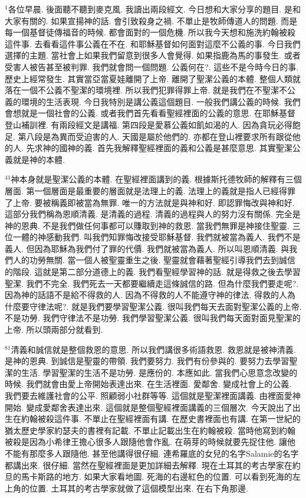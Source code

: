 \documentclass{book}
\begin{document}
$^{1}$各位早晨.
後面聽不聽到麥克風.
我讀出兩段經文.
今日想和大家分享的題目.
是和大家有關的.
如果宣揚神的話.
會引致殺身之禍.
不單止是牧師傳道人的問題.
而是每一個基督徒傳福音的時候.
都會面對的一個危機.
所以我今天想和施洗約翰被殺這件事.
去看看這件事公義在不在.
和耶穌基督如何面對這麼不公義的事.
今日我們選擇的主題.
當社會上如果我們留意到很多人會覺得.
如果指鹿為馬的事發生.
或者受害人被告甚至被判罪.
我們就會問一個問題.
公義何在?.
這些不是今時今日的事.
歷史上經常發生.
其實當亞當夏娃離開了上帝.
離開了聖潔公義的本體.
整個人類就落在一個不公義不聖潔的環境裡.
所以我們犯罪得罪上帝.
就是我們在不聖潔不公義的環境的生活表現.
今日我特別是講公義這個題目.
一般我們講公義的時候.
我們會想就是一個社會的公義.
或者我們首先看看聖經裡面的公義的意思.
在耶穌基督登山補訓裡.
有兩段經文是講福.
第四段是愛慕公義如飢如渴的人.
因為貪玩必得飽足.
第八段是為異而受迫害的人.
天國是屬於他們的.
亦都在登山裡要求所有跟從他的人.
先求神的國神的義.
首先我解釋聖經裡面的義和公義是甚麼意思.
其實聖潔公義就是神的本體.

$^{41}$神本身就是聖潔公義的本體.
在聖經裡面講到的義.
根據斯托德牧師的解釋有三個層面.
第一個層面是最重要的層面就是法理上的義.
法理上的義就是指人已經得罪了上帝.
要被稱義即被當為無罪.
唯一的方法就是與神和好.
即認罪悔改與神和好.
這部分我們稱為恩順清義.
是清義的過程.
清義的過程與人的努力沒有關係.
完全是神的恩典.
不是我們做任何事都可以賺取到神的救恩.
當我們無罪是神接住聖靈.
三位一體的神感動我們.
叫我們知罪悔改接受耶穌基督.
我們就被當為義人.
我們不是義人.
但因為耶穌為我們付了罪的代價.
我們就被當為義人.
所以叫恩順清義.
與我們人的功勞無關.
當一個人被聖靈重生之後.
聖靈就會藉著聖經引導我們去到誠信的階段.
這就是第二部分道德上的義.
我們看聖經學習神的話.
就是得救之後去學習聖潔.
我們不完全.
我們死去一天都要繼續走這條誠信的路.
但為什麼我們要走呢?.
因為神的話語不是給不得救的人.
因為不得救的人不能遵守神的律法.
得救的人為什麼要守律法呢?.
就是我們要學習聖潔公義.
很叫我們每天去面對聖潔公義的上帝.
不是功勞.
我們守律法不是功勞.
我們學習聖潔公義.
很叫我們每天面對面見聖潔的上帝.
所以頭兩部分就看到.

$^{81}$清義和誠信就是整個救恩的意思.
所以我們講很多術語救恩.
救恩就是被神清義.
是神的恩典.
到誠信是聖靈的帶領.
我們要努力.
我們有份參與的.
要努力去學習聖潔的生活.
學習聖潔的生活不是功勞.
是應份的.
本應如此.
當我們心思意念改變的時候.
我們就會由愛上帝開始表達出來.
在生活裡面.
愛鄰舍.
變成社會上的公義.
我們要去維護社會的公平.
照顧弱小社群等等.
這個就是聖潔裡面講義.
由裡面愛神開始.
變成愛鄰舍表達出來.
這個就是整個聖經裡面講義的三個層次.
今天說出了出生在約翰被殺這件事.
不單止在聖經裡面有講.
在歷史書裡面也有講.
在第一世紀的猶太歷史學家約瑟夫的書裡有記載.
不單止記載出生在約翰被殺.
當時他寫到約翰被殺是因為小希律王擔心很多人跟隨他會作亂.
在萌芽的時候就要先捉住他.
讓他不能有那麼多人跟隨他.
甚至他講得很仔細.
連希羅底的女兒的名字Salamie的名字都講出來.
很仔細.
當然在聖經裡面是更加詳細去解釋.
現在土耳其的考古學家在約旦的馬卡斯路的地方.
如果大家看地圖.
死海的右邊紅色的位置.
可以看到死海的左上角的位置.
土耳其的考古學家就做了這個模型出來.
在右下角那邊.
\end{document}
